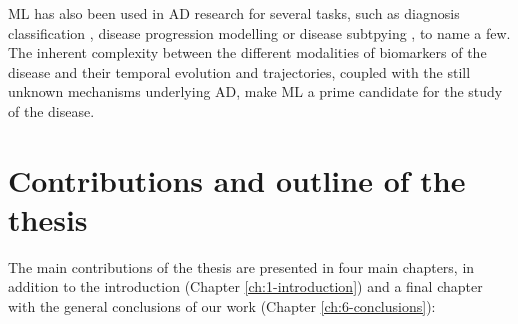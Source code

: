 ML has also been used in AD research for several tasks, such as diagnosis classification \cite{Rathore2017}, disease progression modelling \cite{Oxtoby2017} or disease subtpying \cite{Young2017}, to name a few. The inherent complexity between the different modalities of biomarkers of the disease and their temporal evolution and trajectories, coupled with the still unknown mechanisms underlying AD, make ML a prime candidate for the study of the disease. \\

\section{Contributions and outline of the thesis}

The main contributions of the thesis are presented in four main chapters, in addition to the introduction (Chapter \ref{ch:1-introduction}) and a final chapter with the general conclusions of our work (Chapter \ref{ch:6-conclusions}):

